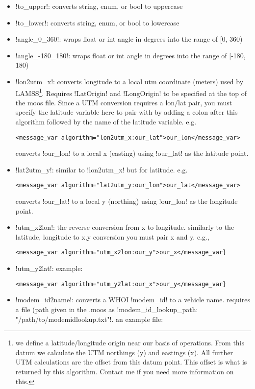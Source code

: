 \begin{itemize}
\item !to_upper!: converts string, enum, or bool to uppercase
\item !to_lower!: converts string, enum, or bool to lowercase
\item !angle_0_360!: wraps float or int angle in degrees into the range of [0, 360)
\item !angle_-180_180!: wraps float or int angle in degrees into the range of [-180, 180)
\item !lon2utm_x!: converts longitude to a local utm coordinate (meters) used by LAMSS\footnote{we define a latitude/longitude origin near our basis of operations. From this datum we calculate the UTM northings (y) and eastings (x). All further UTM calculations are the offset from this datum point. This offset is what is returned by this algorithm. Contact me if you need more information on this.}. Requires !LatOrigin! and !LongOrigin! to be specified at the top of the moos file. Since a UTM conversion requires a lon/lat pair, you must specify the latitude variable here to pair with by adding a colon after this algorithm followed by the name of the latitude variable. e.g.
\begin{verbatim}
<message_var algorithm="lon2utm_x:our_lat">our_lon</message_var>
\end{verbatim}
converts !our_lon! to a local x (easting) using !our_lat! as the latitude point.
\item !lat2utm_y!: similar to !lon2utm_x! but for latitude. e.g. 
\begin{verbatim}
<message_var algorithm="lat2utm_y:our_lon">our_lat</message_var>
\end{verbatim}
converts !our_lat! to a local y (northing) using !our_lon! as the longitude point.
\item !utm_x2lon!: the reverse conversion from x to longitude. similarly to the latitude, longitude to x,y conversion you must pair x and y. e.g., 
\begin{verbatim}<message_var algorithm="utm_x2lon:our_y">our_x</message_var}\end{verbatim}
\item !utm_y2lat!: example: 
\begin{verbatim}
<message_var algorithm="utm_y2lat:our_x">our_y</message_var}
\end{verbatim}
\item !modem_id2name!: converts a WHOI !modem_id! to a vehicle name. requires a file (path given in the .moos as !modem_id_lookup_path: "/path/to/modemidlookup.txt"!. an example file:

\end{itemize}
